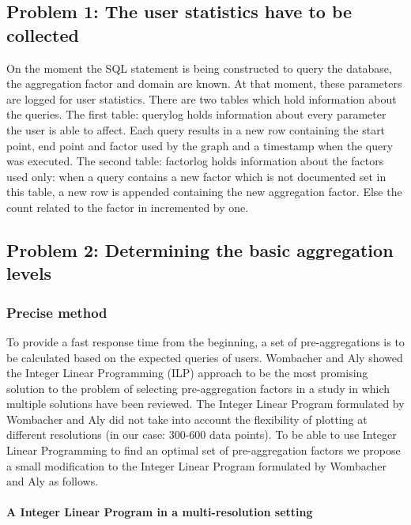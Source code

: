 \subsection{Problem 1: The user statistics have to be collected}
On the moment the SQL statement is being constructed to query the database, the aggregation factor and domain are known. At that moment, these parameters are logged for user statistics.
There are two tables which hold information about the queries. The first table: querylog holds information about every parameter the user is able to affect. Each query results in a new row containing the start point, end point and factor used by the graph and a timestamp when the query was executed. The second table: factorlog holds information about the factors used only: when a query contains a new factor which is not documented set in this table, a new row is appended containing the new aggregation factor. Else the count related to the factor in incremented by one.\\

\subsection{Problem 2: Determining the basic aggregation levels}
\subsubsection{Precise method}
To provide a fast response time from the beginning, a set of pre-aggregations is to be calculated based on the expected queries of users. Wombacher and Aly \cite{wombacher2011} showed the Integer Linear Programming (ILP) approach to be the most promising solution to the problem of selecting pre-aggregation factors in a study in which multiple solutions have been reviewed. The Integer Linear Program formulated by Wombacher and Aly \cite{wombacher2011} did not take into account the flexibility of plotting at different resolutions (in our case: 300-600 data points). To be able to use Integer Linear Programming to find an optimal set of pre-aggregation factors we propose a small modification to the Integer Linear Program formulated by Wombacher and Aly \cite{wombacher2011} as follows.
\paragraph{A Integer Linear Program in a multi-resolution setting}

